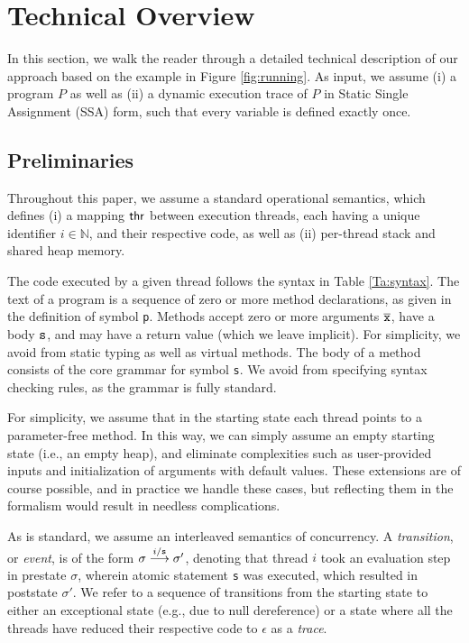\section{Technical Overview}\label{Se:techoverview}

In this section, we walk the reader through a detailed technical description of our approach based on the example in Figure \ref{fig:running}. 
%
As input, we assume (i) a program $P$ as well as (ii) a dynamic execution trace of $P$ in Static Single Assignment (SSA) form, such that every variable is defined exactly once.

\subsection{Preliminaries}

Throughout this paper, we assume a standard operational semantics, which defines (i) a mapping ${\sf thr}$ between
execution threads, each having a unique identifier $i \in \mathbb{N}$, and their respective code, as well as (ii) per-thread stack and shared heap memory. 

The code executed by a given thread follows the syntax in Table \ref{Ta:syntax}. The text of a program is a sequence of zero or more method declarations, as given in the definition of symbol {\tt p}. Methods accept zero or more arguments $\overline{{\tt x}}$, have a body ${\tt s}$, and may have a return value (which we leave implicit). For simplicity, we avoid from static typing as well as virtual methods. The body of a method consists of the core grammar for symbol {\tt s}. We avoid from specifying syntax checking rules, as the grammar is fully standard.

For simplicity, we assume that in the starting state each thread points to a parameter-free method. In this way, we can simply assume an empty starting state (i.e., an empty heap), and eliminate complexities such as user-provided inputs and initialization of arguments with default values. These extensions are of course possible, and in practice we handle these cases, but reflecting them in the formalism would result in needless complications.

As is standard, we assume an interleaved semantics of concurrency. A \emph{transition}, or \emph{event}, is of the form
$\sigma \stackrel{i / {\tt s}}{\longrightarrow} \sigma'$, denoting that thread $i$ took an evaluation step
in prestate $\sigma$, wherein atomic
statement {\tt s} was executed, which resulted in poststate $\sigma'$. We refer to a sequence of transitions from
the starting state to either an exceptional state (e.g., due to null dereference) or a state where all the threads have 
reduced their respective code to $\epsilon$ as a \emph{trace}.

